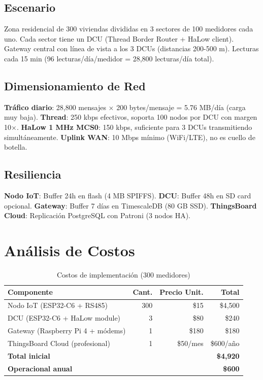 \subsection{Escenario}

Zona residencial de 300 viviendas divididas en 3 sectores de 100 medidores cada uno. Cada sector tiene un DCU (Thread Border Router + HaLow client). Gateway central con línea de vista a los 3 DCUs (distancias 200-500 m). Lecturas cada 15 min (96 lecturas/día/medidor = 28,800 lecturas/día total).

\subsection{Dimensionamiento de Red}

\textbf{Tráfico diario}: 28,800 mensajes $\times$ 200 bytes/mensaje = 5.76 MB/día (carga muy baja). \textbf{Thread}: 250 kbps efectivos, soporta 100 nodos por DCU con margen 10$\times$. \textbf{HaLow 1 MHz MCS0}: 150 kbps, suficiente para 3 DCUs transmitiendo simultáneamente. \textbf{Uplink WAN}: 10 Mbps mínimo (WiFi/LTE), no es cuello de botella.

\subsection{Resiliencia}

\textbf{Nodo IoT}: Buffer 24h en flash (4 MB SPIFFS). \textbf{DCU}: Buffer 48h en SD card opcional. \textbf{Gateway}: Buffer 7 días en TimescaleDB (80 GB SSD). \textbf{ThingsBoard Cloud}: Replicación PostgreSQL con Patroni (3 nodos HA).

\section{Análisis de Costos}

\begin{table}[h]
\centering
\small
\begin{tabular}{|l|r|r|r|}
\hline
\textbf{Componente} & \textbf{Cant.} & \textbf{Precio Unit.} & \textbf{Total} \\
\hline
Nodo IoT (ESP32-C6 + RS485) & 300 & \$15 & \$4,500 \\
DCU (ESP32-C6 + HaLow module) & 3 & \$80 & \$240 \\
Gateway (Raspberry Pi 4 + módems) & 1 & \$180 & \$180 \\
ThingsBoard Cloud (profesional) & 1 & \$50/mes & \$600/año \\
\hline
\textbf{Total inicial} & & & \textbf{\$4,920} \\
\textbf{Operacional anual} & & & \textbf{\$600} \\
\hline
\end{tabular}
\caption{Costos de implementación (300 medidores)}
\end{table}

